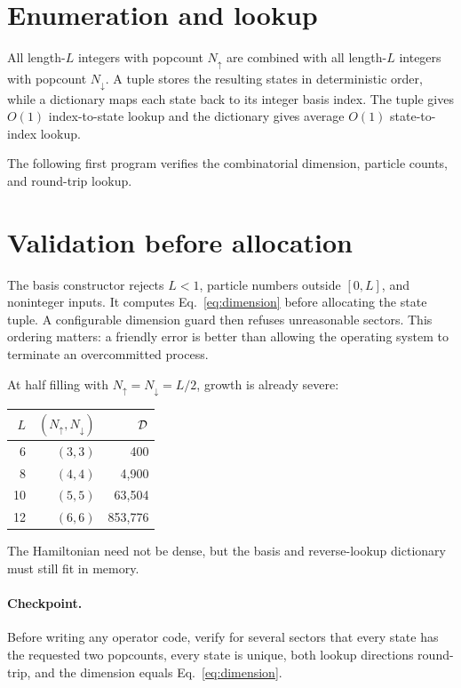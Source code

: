 \section{Enumeration and lookup}

All length-$L$ integers with popcount $N_\uparrow$ are combined with all
length-$L$ integers with popcount $N_\downarrow$.  A tuple stores the resulting
states in deterministic order, while a dictionary maps each state back to its
integer basis index.  The tuple gives $O(1)$ index-to-state lookup and the
dictionary gives average $O(1)$ state-to-index lookup.

The following first program verifies the combinatorial dimension, particle
counts, and round-trip lookup.



\section{Validation before allocation}

The basis constructor rejects $L<1$, particle numbers outside $[0,L]$, and
noninteger inputs.  It computes Eq.~\eqref{eq:dimension} before allocating the
state tuple.  A configurable dimension guard then refuses unreasonable
sectors.  This ordering matters: a friendly error is better than allowing the
operating system to terminate an overcommitted process.

At half filling with $N_\uparrow=N_\downarrow=L/2$, growth is already severe:
\begin{center}
\begin{tabular}{rrr}
\toprule
$L$ & $(N_\uparrow,N_\downarrow)$ & $\mathcal{D}$ \\
\midrule
6  & $(3,3)$ & 400 \\
8  & $(4,4)$ & 4,900 \\
10 & $(5,5)$ & 63,504 \\
12 & $(6,6)$ & 853,776 \\
\bottomrule
\end{tabular}
\end{center}
The Hamiltonian need not be dense, but the basis and reverse-lookup dictionary
must still fit in memory.

\paragraph{Checkpoint.}
Before writing any operator code, verify for several sectors that every state
has the requested two popcounts, every state is unique, both lookup directions
round-trip, and the dimension equals Eq.~\eqref{eq:dimension}.
